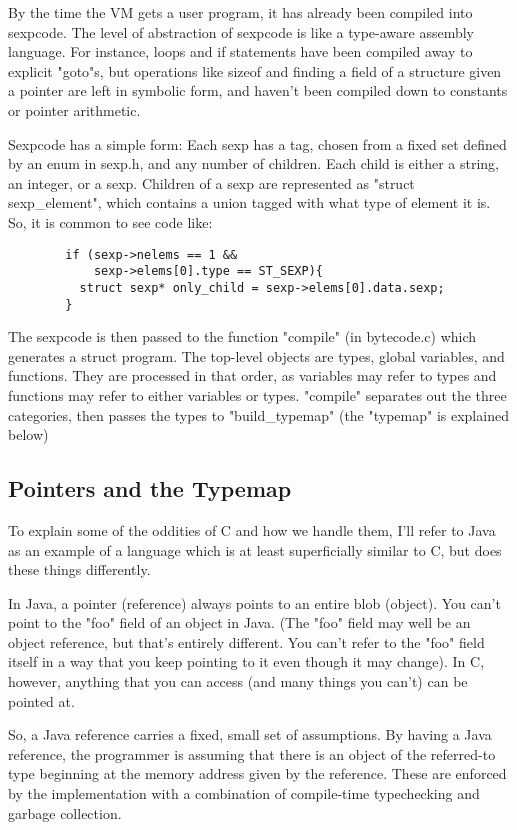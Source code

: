 \documentclass[10pt,a4paper]{report}
\begin{document}
By the time the VM gets a user program, it has already been compiled into sexpcode. The level of abstraction of sexpcode is like a type-aware assembly language. For instance, loops and if statements have been compiled away to explicit "goto"s, but operations like sizeof and finding a field of a structure given a pointer are left in symbolic form, and haven't been compiled down to constants or pointer arithmetic.

Sexpcode has a simple form: Each sexp has a tag, chosen from a fixed set defined by an enum in sexp.h, and any number of children. Each child is either a string, an integer, or a sexp. Children of a sexp are represented as "struct sexp_element", which contains a union tagged with what type of element it is. So, it is common to see code like:

\begin{verbatim}
        if (sexp->nelems == 1 &&
            sexp->elems[0].type == ST_SEXP){
          struct sexp* only_child = sexp->elems[0].data.sexp;
        }
\end{verbatim}

The sexpcode is then passed to the function "compile" (in bytecode.c) which generates a struct program. The top-level objects are types, global variables, and functions. They are processed in that order, as variables may refer to types and functions may refer to either variables or types. "compile" separates out the three categories, then passes the types to "build_typemap" (the "typemap" is explained below)


\subsection{Pointers and the Typemap}

To explain some of the oddities of C and how we handle them, I'll refer to Java as an example of a language which is at least superficially similar to C, but does these things differently.

In Java, a pointer (reference) always points to an entire blob (object). You can't point to the "foo" field of an object in Java. (The "foo" field may well be an object reference, but that's entirely different. You can't refer to the "foo" field itself in a way that you keep pointing to it even though it may change). In C, however, anything that you can access (and many things you can't) can be pointed at.

So, a Java reference carries a fixed, small set of assumptions. By having a Java reference, the programmer is assuming that there is an object of the referred-to type beginning at the memory address given by the reference. These are enforced by the implementation with a combination of compile-time typechecking and garbage collection.
\end{document}
